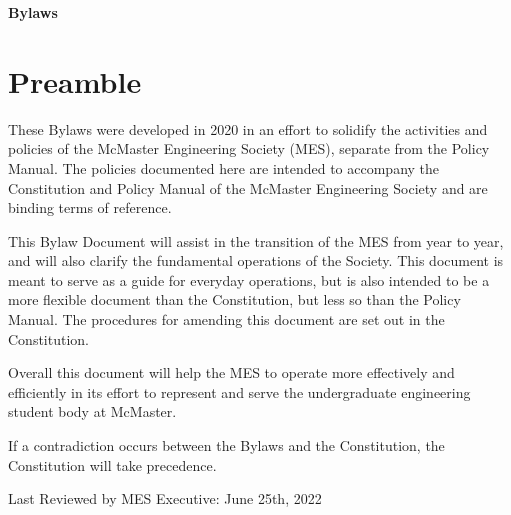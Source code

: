 
\vspace*{10pt}
\hfill {\Huge \textbf{Bylaws}}

\vspace*{25pt}

\section*{Preamble}

These Bylaws were developed in 2020 in an effort to solidify the
activities and policies of the McMaster Engineering Society (MES),
separate from the Policy Manual. The policies documented here are
intended to accompany the Constitution and Policy Manual of the McMaster
Engineering Society and are binding terms of reference.

This Bylaw Document will assist in the transition of the MES from year
to year, and will also clarify the fundamental operations of the
Society. This document is meant to serve as a guide for everyday
operations, but is also intended to be a more flexible document than the
Constitution, but less so than the Policy Manual. The procedures for
amending this document are set out in the Constitution.

Overall this document will help the MES to operate more effectively and
efficiently in its effort to represent and serve the undergraduate
engineering student body at McMaster.

If a contradiction occurs between the Bylaws and the Constitution, the
Constitution will take precedence.

\vfill

Last Reviewed by MES Executive: June 25th, 2022 \vspace{25pt}